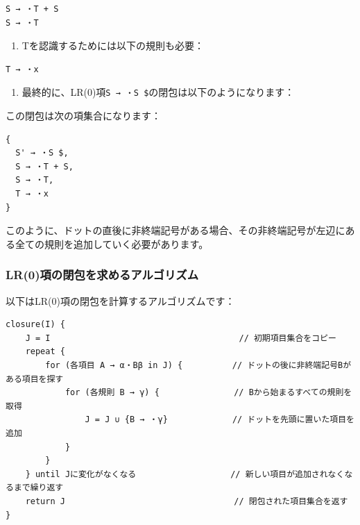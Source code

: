 \begin{verbatim}
S → ・T + S
S → ・T
\end{verbatim}

\begin{enumerate}
\def\labelenumi{\arabic{enumi}.}
\setcounter{enumi}{2}
\tightlist
\item
  Tを認識するためには以下の規則も必要：
\end{enumerate}

\begin{verbatim}
T → ・x
\end{verbatim}

\begin{enumerate}
\def\labelenumi{\arabic{enumi}.}
\setcounter{enumi}{3}
\tightlist
\item
  最終的に、LR(0)項\texttt{S\textquotesingle{}\ →\ ・S\ \$}の閉包は以下のようになります：
\end{enumerate}

この閉包は次の項集合になります：

\begin{verbatim}
{
  S' → ・S $,
  S → ・T + S,
  S → ・T,
  T → ・x
}
\end{verbatim}

このように、ドットの直後に非終端記号がある場合、その非終端記号が左辺にある全ての規則を追加していく必要があります。

\hypertarget{chapter5-lr0ux9805ux306eux9589ux5305ux3092ux6c42ux3081ux308bux30a2ux30ebux30b4ux30eaux30baux30e0}{%
\subsubsection{LR(0)項の閉包を求めるアルゴリズム}\label{chapter5-lr0ux9805ux306eux9589ux5305ux3092ux6c42ux3081ux308bux30a2ux30ebux30b4ux30eaux30baux30e0}}

以下はLR(0)項の閉包を計算するアルゴリズムです：

\begin{verbatim}
closure(I) {
    J = I                                      // 初期項目集合をコピー
    repeat {
        for (各項目 A → α・Bβ in J) {          // ドットの後に非終端記号Bがある項目を探す
            for (各規則 B → γ) {               // Bから始まるすべての規則を取得
                J = J ∪ {B → ・γ}             // ドットを先頭に置いた項目を追加
            }
        }
    } until Jに変化がなくなる                   // 新しい項目が追加されなくなるまで繰り返す
    return J                                  // 閉包された項目集合を返す
}
\end{verbatim}

